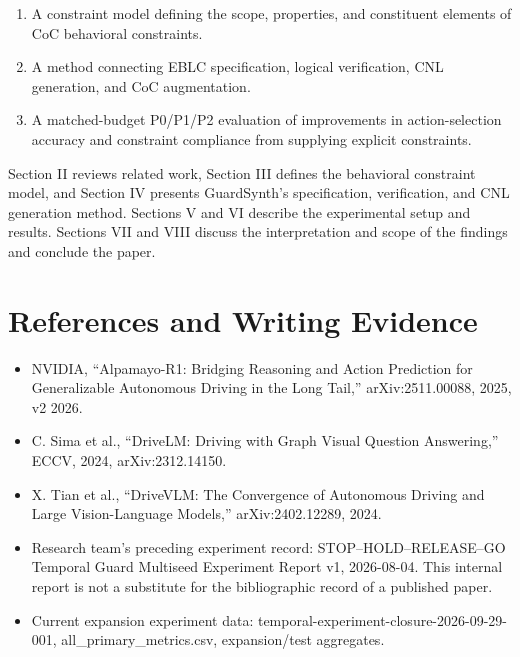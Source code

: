 \documentclass[11pt,a4paper]{article}
\begin{document}
\begin{enumerate}
\item A constraint model defining the scope, properties, and constituent elements of CoC behavioral constraints.
\item A method connecting EBLC specification, logical verification, CNL generation, and CoC augmentation.
\item A matched-budget P0/P1/P2 evaluation of improvements in action-selection accuracy and constraint compliance from supplying explicit constraints.
\end{enumerate}
Section II reviews related work, Section III defines the behavioral constraint model, and Section IV presents GuardSynth's specification, verification, and CNL generation method. Sections V and VI describe the experimental setup and results. Sections VII and VIII discuss the interpretation and scope of the findings and conclude the paper.\par\vspace{5pt}
\clearpage\section*{References and Writing Evidence}
\begin{itemize}
\item [1] NVIDIA, “Alpamayo-R1: Bridging Reasoning and Action Prediction for Generalizable Autonomous Driving in the Long Tail,” arXiv:2511.00088, 2025, v2 2026.
\item [2] C. Sima et al., “DriveLM: Driving with Graph Visual Question Answering,” ECCV, 2024, arXiv:2312.14150.
\item [3] X. Tian et al., “DriveVLM: The Convergence of Autonomous Driving and Large Vision-Language Models,” arXiv:2402.12289, 2024.
\item [4] Research team's preceding experiment record: STOP–HOLD–RELEASE–GO Temporal Guard Multiseed Experiment Report v1, 2026-08-04. This internal report is not a substitute for the bibliographic record of a published paper.
\item [5] Current expansion experiment data: temporal-experiment-closure-2026-09-29-001, all\_\allowbreak{}primary\_\allowbreak{}metrics.csv, expansion/test aggregates.
\end{itemize}
\end{document}
